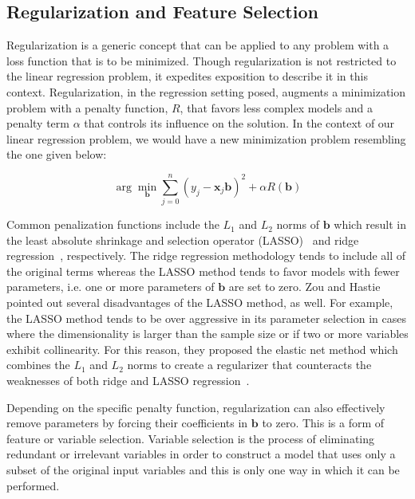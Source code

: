 \subsection{Regularization and Feature Selection}

Regularization is a generic concept that can be applied to any problem with a loss function that is to be minimized.
%
Though regularization is not restricted to the linear regression problem, it expedites exposition to describe it in this context.
%
Regularization, in the regression setting posed, augments a minimization problem with a penalty function, $R$, that favors less complex models and a penalty term $\alpha$ that controls its influence on the solution. In the context of our linear regression problem, we would have a new minimization problem resembling the one given below:

\begin{equation}
\arg\min_{\textbf{b}} \sum_{j=0}^n(y_j - \textbf{x}_j\textbf{b})^2 + \alpha R(\textbf{b})
\label{eq:genericRegularization}
\end{equation}

Common penalization functions include the $L_1$ and $L_2$ norms of $\textbf{b}$ which result in the least absolute shrinkage and selection operator (LASSO)~\cite{Tibshirani1996} and ridge regression~\cite{Hoerl1959,Hoerl1962}, respectively.
%
The ridge regression methodology tends to include all of the original terms whereas the LASSO method tends to favor models with fewer parameters, i.e. one or more parameters of $\textbf{b}$ are set to zero.
%
Zou and Hastie pointed out several disadvantages of the LASSO method, as well.
%
For example, the LASSO method tends to be over aggressive in its parameter selection in cases where the dimensionality is larger than the sample size or if two or more variables exhibit collinearity.
%
For this reason, they proposed the elastic net method which combines the $L_1$ and $L_2$ norms to create a regularizer that counteracts the weaknesses of both ridge and LASSO regression~\cite{ZouHastie2005}.


Depending on the specific penalty function, regularization can also effectively remove parameters by forcing their coefficients in $\textbf{b}$ to zero.
%
This is a form of feature or variable selection.
%
Variable selection is the process of eliminating redundant or irrelevant variables in order to construct a model that uses only a subset of the original input variables and this is only one way in which it can be performed.

